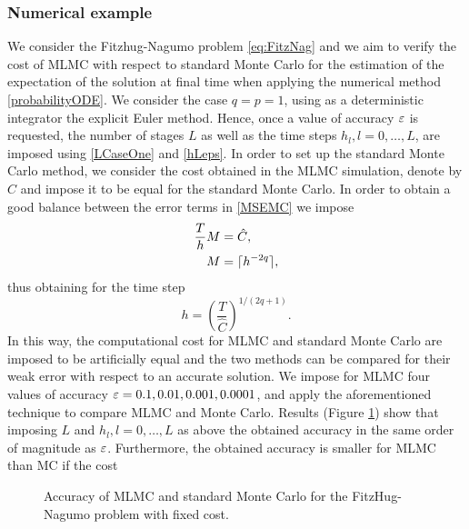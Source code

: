 
\subsubsection{Numerical example}
We consider the Fitzhug-Nagumo problem \eqref{eq:FitzNag} and we aim to verify the cost of MLMC with respect to standard Monte Carlo for the estimation of the expectation of the solution at final time when applying the numerical method \eqref{probabilityODE}. We consider the case $q = p = 1$, using as a deterministic integrator the explicit Euler method. Hence, once a value of accuracy $\varepsilon$ is requested, the number of stages $L$ as well as the time steps $h_l, l = 0, \ldots, L$, are imposed using \eqref{LCaseOne} and \eqref{hLeps}. In order to set up the standard Monte Carlo method, we consider the cost obtained in the MLMC simulation, denote by $\hat C$ and impose it to be equal for the standard Monte Carlo. In order to obtain a good balance between the error terms in \eqref{MSEMC} we impose
\begin{equation}
\begin{aligned}
	\frac{T}{h} M &= \hat C, \\
	M &= \lceil h^{-2q}\rceil,
\end{aligned}
\end{equation}
thus obtaining for the time step
\begin{equation}
	h = \left(\frac{T}{\hat C}\right)^{1 / (2q + 1)}.
\end{equation}
In this way, the computational cost for MLMC and standard Monte Carlo are imposed to be artificially equal and the two methods can be compared for their weak error with respect to an accurate solution. We impose for MLMC four values of accuracy $\varepsilon = 0.1, 0.01, 0.001, 0.0001$, and apply the aforementioned technique to compare MLMC and Monte Carlo. Results (Figure \ref{fig:MLMCpractice}) show that imposing $L$ and $h_l, l = 0, \ldots, L$ as above the obtained accuracy in the same order of magnitude as $\varepsilon$. Furthermore, the obtained accuracy is smaller for MLMC than MC if the cost 

\begin{figure}
	\centering
	\resizebox{0.6\linewidth}{!}{}
	\caption{Accuracy of MLMC and standard Monte Carlo for the FitzHug-Nagumo problem with fixed cost.}
	\label{fig:MLMCpractice}
\end{figure}